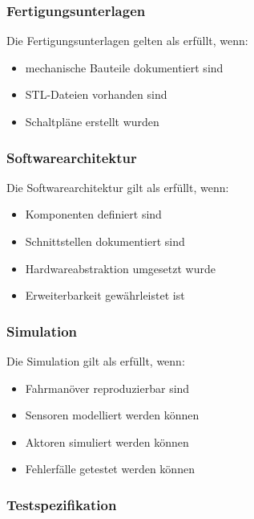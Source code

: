 \subsubsection{Fertigungsunterlagen}\label{fertigungsunterlagen}

Die Fertigungsunterlagen gelten als erfüllt, wenn:

\begin{itemize}
\tightlist
\item
  mechanische Bauteile dokumentiert sind
\item
  STL-Dateien vorhanden sind
\item
  Schaltpläne erstellt wurden
\end{itemize}

\subsubsection{Softwarearchitektur}\label{softwarearchitektur}

Die Softwarearchitektur gilt als erfüllt, wenn:

\begin{itemize}
\tightlist
\item
  Komponenten definiert sind
\item
  Schnittstellen dokumentiert sind
\item
  Hardwareabstraktion umgesetzt wurde
\item
  Erweiterbarkeit gewährleistet ist
\end{itemize}

\subsubsection{Simulation}\label{simulation-1}

Die Simulation gilt als erfüllt, wenn:

\begin{itemize}
\tightlist
\item
  Fahrmanöver reproduzierbar sind
\item
  Sensoren modelliert werden können
\item
  Aktoren simuliert werden können
\item
  Fehlerfälle getestet werden können
\end{itemize}

\subsubsection{Testspezifikation}\label{testspezifikation}

